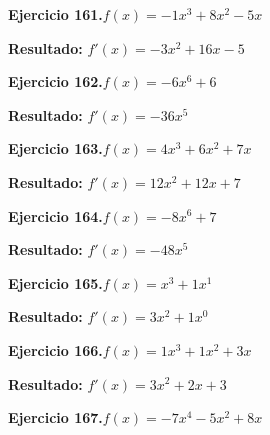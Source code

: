 \documentclass[10pt,a4paper]{article}
\begin{document}
\begin{ejbox}
\textbf{Ejercicio 161.}\quad $f(x) = -1x^3 +8x^2 -5x$
\end{ejbox}

\begin{solbox}
\textbf{Resultado:} \(\displaystyle f'(x) = -3x^2 +16x -5\)
\end{solbox}

\begin{ejbox}
\textbf{Ejercicio 162.}\quad $f(x) = -6x^{6} +6$
\end{ejbox}

\begin{solbox}
\textbf{Resultado:} \(\displaystyle f'(x) = -36x^{5}\)
\end{solbox}

\newpage
\begin{ejbox}
\textbf{Ejercicio 163.}\quad $f(x) = 4x^3 +6x^2 +7x$
\end{ejbox}

\begin{solbox}
\textbf{Resultado:} \(\displaystyle f'(x) = 12x^2 +12x +7\)
\end{solbox}

\begin{ejbox}
\textbf{Ejercicio 164.}\quad $f(x) = -8x^{6} +7$
\end{ejbox}

\begin{solbox}
\textbf{Resultado:} \(\displaystyle f'(x) = -48x^{5}\)
\end{solbox}

\begin{ejbox}
\textbf{Ejercicio 165.}\quad $f(x) = x^{3} +1x^{1}$
\end{ejbox}

\begin{solbox}
\textbf{Resultado:} \(\displaystyle f'(x) = 3x^{2} +1x^{0}\)
\end{solbox}

\newpage
\begin{ejbox}
\textbf{Ejercicio 166.}\quad $f(x) = 1x^3 +1x^2 +3x$
\end{ejbox}

\begin{solbox}
\textbf{Resultado:} \(\displaystyle f'(x) = 3x^2 +2x +3\)
\end{solbox}

\begin{ejbox}
\textbf{Ejercicio 167.}\quad $f(x) = -7x^{4} -5x^2 +8x$
\end{ejbox}
\end{document}

